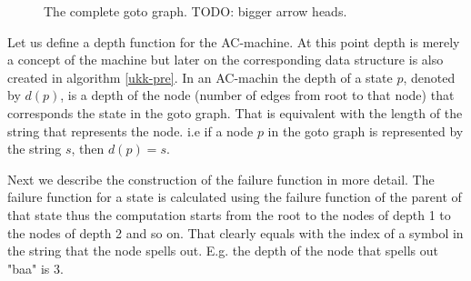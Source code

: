\documentclass[english,twoside,censored,csm,algorithms-track-2020]{HYthesisML}
\theoremstyle{plain}
\theoremstyle{definition}
\begin{document}
  \begin{figure}[h]
  \centering
  \caption{The complete goto graph. TODO: bigger arrow heads.} \label{fig-ac-goto}
\end{figure}

  Let us define a depth function for the AC-machine. At this point depth is merely a concept of the
  machine but later on the corresponding data structure is also created in algorithm \ref{ukk-pre}.
  In an AC-machin the depth of a state $p$, denoted by $d(p)$, is a depth of the node (number of
  edges from root to that node) that corresponds
  the state in the goto graph. That is equivalent with the length of the string that represents the
  node. i.e if a node $p$ in the goto graph is represented by the string $s$, then $d(p) = s$.
  
  Next we describe the construction of the failure function in more detail. The failure function
  for a state is calculated using the failure function of the parent of that state thus the computation
  starts from the root to the nodes of depth 1 to the nodes of depth 2 and so on. That clearly
  equals with the index of a symbol in the string that the node spells out. E.g. the depth of
  the node that spells out "baa" is 3.
\end{document}
